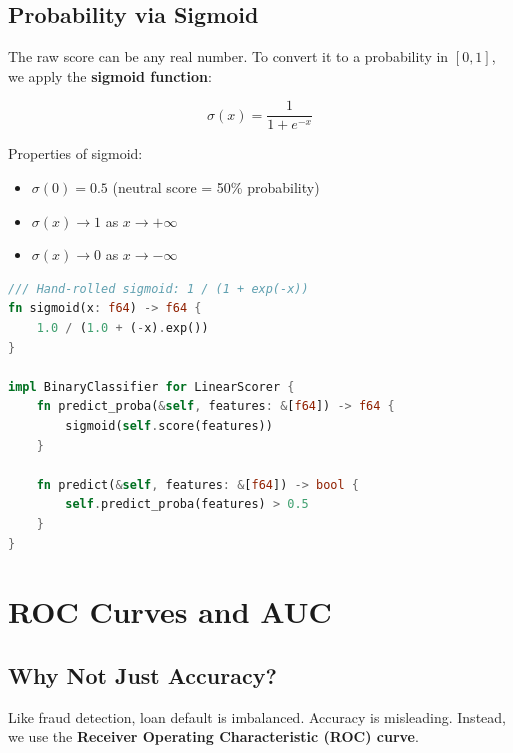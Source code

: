\subsection{Probability via Sigmoid}

The raw score can be any real number. To convert it to a probability in $[0, 1]$,
we apply the \textbf{sigmoid function}:


\[
\sigma(x) = \frac{1}{1 + e^{-x}}
\]

Properties of sigmoid:
\begin{itemize}
    \item $\sigma(0) = 0.5$ (neutral score = 50\% probability)
    \item $\sigma(x) \to 1$ as $x \to +\infty$
    \item $\sigma(x) \to 0$ as $x \to -\infty$
\end{itemize}

\begin{lstlisting}[language=Rust]
/// Hand-rolled sigmoid: 1 / (1 + exp(-x))
fn sigmoid(x: f64) -> f64 {
    1.0 / (1.0 + (-x).exp())
}

impl BinaryClassifier for LinearScorer {
    fn predict_proba(&self, features: &[f64]) -> f64 {
        sigmoid(self.score(features))
    }

    fn predict(&self, features: &[f64]) -> bool {
        self.predict_proba(features) > 0.5
    }
}
\end{lstlisting}

\section{ROC Curves and AUC}

\subsection{Why Not Just Accuracy?}


Like fraud detection, loan default is imbalanced. Accuracy is misleading.
Instead, we use the \textbf{Receiver Operating Characteristic (ROC) curve}.

